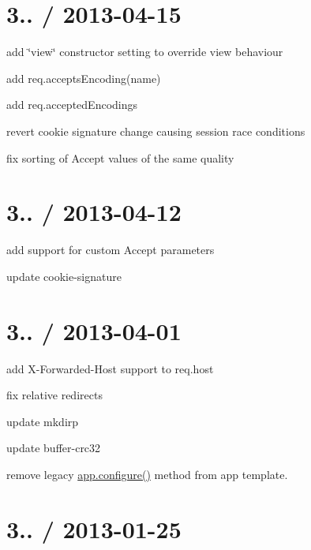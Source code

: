 \section*{3.. / 2013-\/04-\/15 }


\begin{DoxyItemize}
\item add \char`\"{}view\char`\"{} constructor setting to override view behaviour
\item add req.\+accepts\+Encoding(name)
\item add req.\+accepted\+Encodings
\item revert cookie signature change causing session race conditions
\item fix sorting of Accept values of the same quality
\end{DoxyItemize}

\section*{3.. / 2013-\/04-\/12 }


\begin{DoxyItemize}
\item add support for custom Accept parameters
\item update cookie-\/signature
\end{DoxyItemize}

\section*{3.. / 2013-\/04-\/01 }


\begin{DoxyItemize}
\item add X-\/\+Forwarded-\/\+Host support to {\ttfamily req.\+host}
\item fix relative redirects
\item update mkdirp
\item update buffer-\/crc32
\item remove legacy \hyperlink{namespaceversion_aedc91fd7b4b027899ea1441123d88f96}{app.\+configure()} method from app template.
\end{DoxyItemize}

\section*{3.. / 2013-\/01-\/25 }


